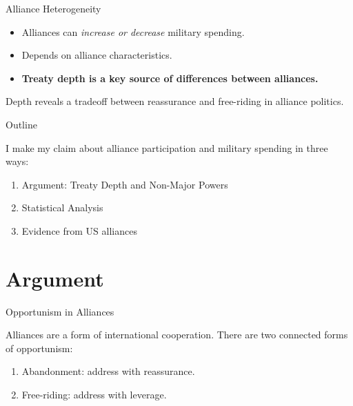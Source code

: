 \documentclass[12pt]{beamer}
\begin{document}

\begin{frame}{Alliance Heterogeneity}


\begin{itemize}
\item Alliances can \textit{increase or decrease} military spending. 
\pause
\item Depends on alliance characteristics. 
\pause 
\item \textbf{Treaty depth is a key source of differences between alliances.}
\end{itemize} 

\end{frame}

 
 \begin{frame}[standout]

Depth reveals a tradeoff between reassurance and free-riding in alliance politics. 

 \end{frame}



\begin{frame}{Outline}

I make my claim about alliance participation and military spending in three ways: 

\pause
\begin{enumerate}
\item Argument: Treaty Depth and Non-Major Powers
\pause
\item Statistical Analysis
\pause
\item Evidence from US alliances
\end{enumerate}


\end{frame}


\section{Argument}



\begin{frame}{Opportunism in Alliances}

Alliances are a form of international cooperation. There are two connected forms of opportunism: 
\begin{enumerate} 
\pause
\item Abandonment: address with reassurance.  
\pause
\item Free-riding: address with leverage. 
\end{enumerate}  

\end{frame}
\end{document}
